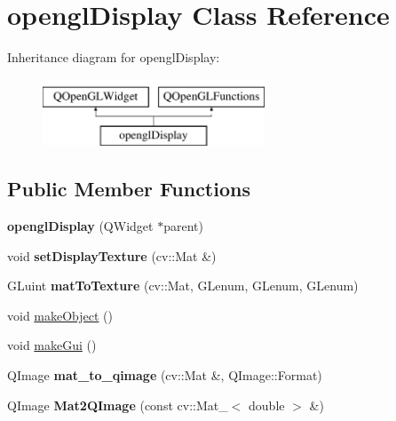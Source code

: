 \hypertarget{classopengl_display}{}\section{opengl\+Display Class Reference}
\label{classopengl_display}
Inheritance diagram for opengl\+Display\+:\begin{figure}[H]
\begin{center}
\leavevmode
\includegraphics[height=2.000000cm]{classopengl_display}
\end{center}
\end{figure}
\subsection*{Public Member Functions}
\begin{DoxyCompactItemize}
\item 
\mbox{\label{classopengl_display_a27a0628008cf743b5fa003a3b1c56a86}} 
{\bfseries opengl\+Display} (Q\+Widget $\ast$parent)
\item 
\mbox{\label{classopengl_display_a52e8e9c3e3ce23ac0f434bb9d6d58630}} 
void {\bfseries set\+Display\+Texture} (cv\+::\+Mat \&)
\item 
\mbox{\label{classopengl_display_a00335d58fa4469ff22d5b1159b0c1e5a}} 
G\+Luint {\bfseries mat\+To\+Texture} (cv\+::\+Mat, G\+Lenum, G\+Lenum, G\+Lenum)
\item 
void \mbox{\hyperlink{classopengl_display_a2227c65237769f48f1d722e65fd389bd}{make\+Object}} ()
\item 
void \mbox{\hyperlink{classopengl_display_ab03aeea355ba1de55ce03381ef1c2d62}{make\+Gui}} ()
\item 
\mbox{\label{classopengl_display_a0003c771d33b6f4188acdefa9c49eb67}} 
Q\+Image {\bfseries mat\+\_\+to\+\_\+qimage} (cv\+::\+Mat \&, Q\+Image\+::\+Format)
\item 
\mbox{\label{classopengl_display_ae68fcd050ff90d6b140564bdef3a9b23}} 
Q\+Image {\bfseries Mat2\+Q\+Image} (const cv\+::\+Mat\+\_\+$<$ double $>$ \&)
\end{DoxyCompactItemize}
